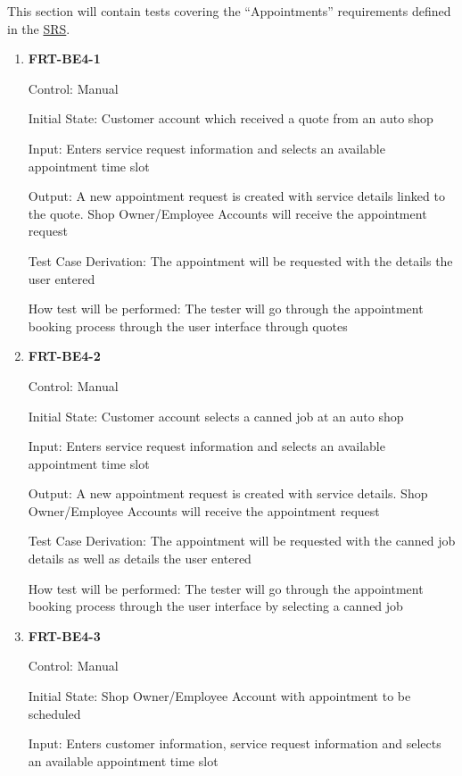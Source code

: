\documentclass[12pt, titlepage]{article}
\begin{document}
This section will contain tests covering the ``Appointments'' requirements defined in the
\href{https://github.com/arkinmodi/project-sayyara/blob/main/docs/SRS/SRS.pdf}{SRS}.

\begin{enumerate}

	\item \textbf{FRT-BE4-1}

	      Control: Manual

	      Initial State: Customer account which received a quote from an auto shop

	      Input: Enters service request information and selects an available appointment time slot

	      Output: A new appointment request is created with service details linked to the quote. Shop
	      Owner/Employee Accounts will receive the appointment request

	      Test Case Derivation: The appointment will be requested with the details the user entered

	      How test will be performed: The tester will go through the appointment booking process through the
	      user interface through quotes

	\item \textbf{FRT-BE4-2}

	      Control: Manual

	      Initial State: Customer account selects a canned job at an auto shop

	      Input: Enters service request information and selects an available appointment time slot

	      Output: A new appointment request is created with service details. Shop Owner/Employee Accounts
	      will receive the appointment request

	      Test Case Derivation: The appointment will be requested with the canned job details as well as
	      details the user entered

	      How test will be performed: The tester will go through the appointment booking process through the
	      user interface by selecting a canned job

	\item \textbf{FRT-BE4-3}

	      Control: Manual

	      Initial State: Shop Owner/Employee Account with appointment to be scheduled

	      Input: Enters customer information, service request information and selects an available
	      appointment time slot


\end{enumerate}
\end{document}
